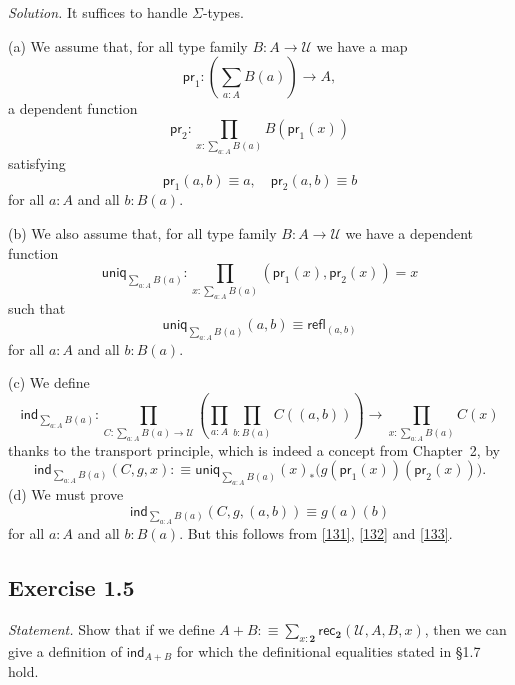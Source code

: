 \documentclass[12pt]{article}
\newcommand{\ind}{\mathsf{ind}}
\newcommand{\nn}{\noindent}
\newcommand{\pr}{\mathsf{pr}}
\newcommand{\rec}{\mathsf{rec}}
\newcommand{\refl}{\mathsf{refl}}
\newcommand{\two}{\mathbf2}
\newcommand{\U}{\mathcal U}
\newcommand{\uniq}{\mathsf{uniq}}
\begin{document}
\nn\emph{Solution.} It suffices to handle $\Sigma$-types. 

\nn(a) We assume that, for all type family $B:A\to\U$ we have a map 
$$
\pr_1:\left(\sum_{a:A}B(a)\right)\to A,
$$ 
a dependent function 
$$
\pr_2:\prod_{x:\sum_{a:A}B(a)}B(\pr_1(x))
$$
satisfying
\begin{equation}\label{131}
\pr_1(a,b)\equiv a,\quad\pr_2(a,b)\equiv b
\end{equation}
for all $a:A$ and all $b:B(a)$.

\nn(b) We also assume that, for all type family $B:A\to\U$ we have a dependent function 
$$
\uniq_{\sum_{a:A}B(a)}:\prod_{x:\sum_{a:A}B(a)}(\pr_1(x),\pr_2(x))=x
$$ 
such that 
\begin{equation}\label{132}
\uniq_{\sum_{a:A}B(a)}(a,b)\equiv\refl_{(a,b)}
\end{equation}
for all $a:A$ and all $b:B(a)$. 

\nn(c) We define
$$
\ind_{\sum_{a:A}B(a)} : \prod_{C:\sum_{a:A}B(a)\to\U} 
\left(\prod_{a:A}\prod_{b:B(a)} C((a,b))\right) 
\to \prod_{x:\sum_{a:A}B(a)} C(x)
$$
thanks to the transport principle, which is indeed a concept from Chapter~2, by
\begin{equation}\label{133}
\ind_{\sum_{a:A}B(a)}(C,g,x):
\equiv\uniq_{\sum_{a:A}B(a)}(x)_*\Big(g(\pr_1(x))(\pr_2(x))\Big).
\end{equation}
(d) We must prove 
$$
\ind_{\sum_{a:A}B(a)}(C,g,(a,b))\equiv g(a)(b)
$$
for all $a:A$ and all $b:B(a)$. But this follows from \eqref{131}, \eqref{132} and \eqref{133}.


\subsection{Exercise 1.5}

\emph{Statement.} Show that if we define $A+B:\equiv\sum_{x:\two}\rec_\two(\U,A,B,x)$, then we can give a definition of $\ind_{A+B}$ for which the definitional equalities stated in \S1.7 hold.
\end{document}
